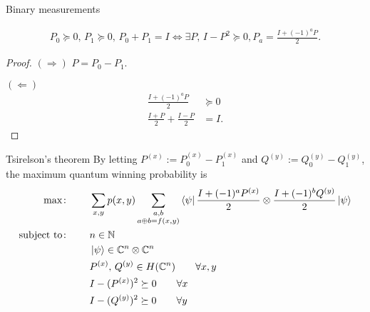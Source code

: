 \documentclass{beamer}
\begin{document}
\begin{frame}{Binary measurements}
\begin{lemma}
\begin{align*}
P_0\succeq 0,\, P_1\succeq 0,\, P_0+P_1=I
\iff
\exists P,\, I - P^2 \succeq 0, 
P_a = \frac{I+(-1)^aP}2.
\end{align*}
\end{lemma}
\begin{proof}
$(\Rightarrow)$ $P=P_0-P_1$.

\vspace{1em}
$(\Leftarrow)$ 
\begin{align*}
\frac{I+(-1)^aP}2&\succeq 0\\
\frac{I+P}2 + \frac{I-P}2 &= I.
\end{align*}
\end{proof}
\end{frame}

\begin{frame}{Tsirelson's theorem}
\small
By letting $P^{(x)} := P_0^{(x)} - P_1^{(x)}$ and $Q^{(y)} := Q_0^{(y)} - Q_1^{(y)}$,
the maximum quantum winning probability is
\begin{align*}
\max\colon\qquad& \sum_{x,y}p(x,y)\sum_{\substack{a,b\\ a\oplus b = f(x,y)}} \bra{\psi}\frac{I+(-1)^aP^{(x)}}2\otimes \frac{I+(-1)^b Q^{(y)}}2\ket{\psi}\\
\text{subject to}\colon\qquad&
n\in\mathbb{N}\\
&\ket{\psi} \in \mathbb{C}^n\otimes\mathbb{C}^n\\
&P^{(x)},\, Q^{(y)} \in H(\mathbb{C}^n)\qquad  \forall x,y\\
&I-(P^{(x)})^2\succeq 0\qquad \forall x\\
&I-(Q^{(y)})^2\succeq 0\qquad \forall y\\
\end{align*}
\end{frame}
\end{document}
